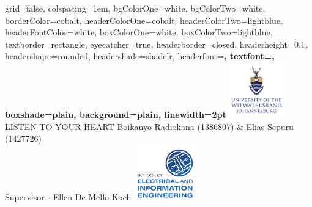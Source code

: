 \documentclass[landscape,final,a0paper,fontscale=0.285]{baposter}
\begin{document}
\begin{poster}%
  {
  grid=false,
  colspacing=1em,
  bgColorOne=white,
  bgColorTwo=white,
  borderColor=cobalt,
  headerColorOne=cobalt,
  headerColorTwo=lightblue,
  headerFontColor=white,
  boxColorOne=white,
  boxColorTwo=lightblue,
  textborder=rectangle,%
  eyecatcher=true,
  headerborder=closed,
  headerheight=0.1\textheight,
  headershape=rounded,%
  headershade=shadelr,
  headerfont=\Large\bf\textsc, %
  textfont={\setlength{\parindent}{1.5em}},
  boxshade=plain,
  background=plain,
  linewidth=2pt
  }
  { \includegraphics[height=6.5em]{wits.jpg}} 
  { \textcolor{headerBlue}{\selectfont LISTEN \hspace{1mm}TO\hspace{1mm}  YOUR \hspace{1mm} HEART}\vspace{0.25em}}
  {\selectfont Boikanyo Radiokana (1386807) \& Elias Sepuru (1427726)\\ Supervisor - Ellen De Mello Koch }
  {%
    \includegraphics[height=6.5em]{EIE-Logo-Full-Colour.png}
  }

    \newcommand{\colouredcircle}{%
      \tikz{\useasboundingbox (-0.2em,-0.32em) rectangle(0.2em,0.32em); \draw[draw=black,fill=lightblue,line width=0.03em] (0,0) circle(0.18em);}}


\end{poster}
\end{document}
